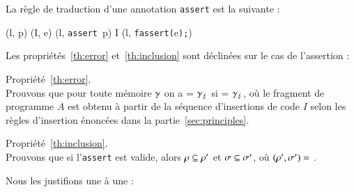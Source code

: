 La règle de traduction d'une annotation \lstinline'assert' est la suivante :

\begin{center}
{
  {(l, p) \prule (I, e)}
  {(l, \mbox{\lstinline'assert'}~p\semicolon)
    \arule I \concat (l, \mbox{\lstinline'fassert('}e\mbox{\lstinline');'})}{}
}
\end{center}

Les propriétés~\ref{th:error} et~\ref{th:inclusion} sont déclinées sur le cas
de l'assertion :

Propriété~\ref{th:error}.\\
Prouvons que pour toute mémoire $\gamma$ on a
 = $\gamma_\lightning$
si  = $\gamma_\lightning$,
où le fragment de programme $A$ est obtenu à partir de la séquence d'insertions
de code $I$ selon les règles d'insertion énoncées dans la
partie~\ref{sec:principles}.

Propriété~\ref{th:inclusion}.\\
Prouvons que si l'\lstinline'assert' est valide, alors
$\rho \subseteq \rho'$ et $\sigma \subseteq \sigma'$, où $(\rho', \sigma') =$
.

Nous les justifions une à une :

